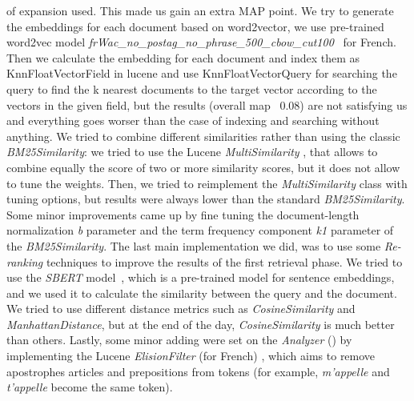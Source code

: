 of expansion used. This made us gain an extra \ac{MAP} point.
\newline
We try to generate the embeddings for each document based on word2vector, we use pre-trained word2vec model \textit{frWac\_no\_postag\_no\_phrase\_500\_cbow\_cut100}~\cite{fauconnier_2015} for French. Then we calculate the embedding for each document and index them as KnnFloatVectorField in lucene and use KnnFloatVectorQuery for searching the query to find the k nearest documents to the target vector according to the vectors in the given field, but the results (overall map ~0.08) are not satisfying us and everything goes worser than the case of indexing and searching without anything.
\newline
We tried to combine different similarities rather than using the classic \textit{BM25Similarity}: we tried to use the Lucene \textit{MultiSimilarity} \cite{lucenemultisimilarity}, that allows to combine equally the score of two or more similarity scores, but it does not allow to
tune the weights. Then, we tried to reimplement the \textit{MultiSimilarity} class with tuning options, but results were always lower than the standard \textit{BM25Similarity}. Some minor improvements came up by fine tuning the document-length
normalization \textit{b} parameter and the term frequency component \textit{k1} parameter of the \textit{BM25Similarity}.
\newline
The last main implementation we did, was to use some \textit{Re-ranking} techniques to improve the results of the first retrieval phase.
We tried to use the \textit{SBERT} model~\cite{reimers-2019-sentence-bert}, which is a pre-trained model for sentence embeddings, and we used it to calculate the similarity between the query and the document.
We tried to use different distance metrics such as \textit{CosineSimilarity} and \textit{ManhattanDistance}, but at the end of the day, \textit{CosineSimilarity} is much better than others.
\newline
Lastly, some minor adding were set on the \textit{Analyzer} (\cite{analyzer_subsec}) by implementing the Lucene \textit{ElisionFilter} (for French) \cite{luceneelisionfilter}, which aims to remove apostrophes articles and prepositions from tokens (for example, \textit{m'appelle} and \textit{t'appelle} become the same token).





